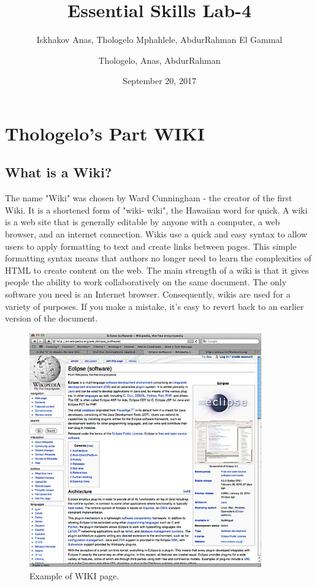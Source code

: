 \documentclass[12pt,a4paper]{report}
\author{Iskhakov Anas, Thologelo Mphahlele, AbdurRahman El Gammal}
\begin{document}
\title{ Essential Skills Lab-4 }
	\author{Thologelo, Anas, AbdurRahman}
	\date{September 20, 2017}
\maketitle
	\tableofcontents
	\chapter{Thologelo's Part WIKI}
	\section{What is a Wiki?}
	The name "Wiki" was chosen by Ward Cunningham - the creator of the first Wiki. It is a shortened form of "wiki- wiki", the Hawaiian word for quick. A wiki is a web site that is generally editable by anyone with a computer, a web browser, and an internet connection. Wikis use a quick and easy syntax to allow users to apply formatting to text and create links between pages. This simple formatting syntax means that authors no longer need to learn the complexities of HTML to create content on the web. The main strength of a wiki is that it gives people the ability to work collaboratively on the same document. The only software you need is an Internet browser. Consequently, wikis are used for a variety of purposes. If you make a mistake, it's easy to revert back to an earlier version of the document. 

	\begin{figure}[h]
		\centering
		\includegraphics[width=10cm]{wikiexample.jpg}
		\caption{Example of WIKI page.}
	\end{figure}
\end{document}

